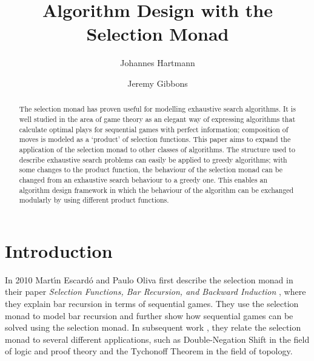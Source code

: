 \documentclass[runningheads]{llncs}
\begin{document}
%
\title{Algorithm Design with the Selection Monad}

\author{Johannes Hartmann \and Jeremy Gibbons}
%

%
\maketitle              
% 
\begin{abstract}
The selection monad has proven useful for modelling exhaustive search algorithms. It is well studied in the area of game theory as an elegant way of expressing algorithms that calculate optimal plays for sequential games with perfect information; composition of moves is modeled as a `product' of selection functions. This paper aims to expand the application of the selection monad to other classes of algorithms. The structure used to describe exhaustive search problems can easily be applied to greedy algorithms; with some changes to the product function, the behaviour of the selection monad can be changed from an exhaustive search behaviour to a greedy one. This enables an algorithm design framework in which the behaviour of the algorithm can be exchanged modularly by using different product functions.

\end{abstract}
%
%
%
\section{Introduction}
\label{Introduction}
In 2010 Mart{\'\i}n Escard{\'o} and Paulo Oliva first describe the selection monad in their paper \textit{Selection Functions, Bar Recursion, and Backward Induction} \cite{escardo2010selection}, where they explain bar recursion in terms of sequential games. They use the selection monad to model bar recursion and further show how sequential games can be solved using the selection monad. In subsequent work \cite{escardo2010sequential}, they relate the selection monad to several different applications, such as Double-Negation Shift in the field of logic and proof theory and the Tychonoff Theorem in the field of topology.
\end{document}
